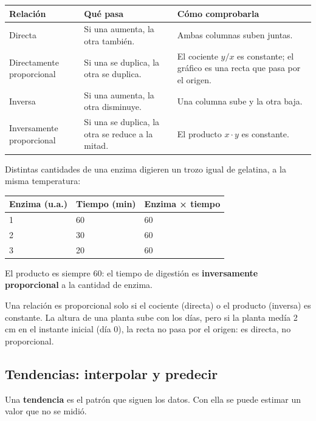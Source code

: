 \begin{center}\small
\begin{tabularx}{\linewidth}{@{}>{\raggedright\arraybackslash\hsize=0.71\hsize}X>{\raggedright\arraybackslash\hsize=1.14\hsize}X>{\raggedright\arraybackslash\hsize=1.14\hsize}X@{}}
\toprule
\textbf{Relación} & \textbf{Qué pasa} & \textbf{Cómo comprobarla} \\
\midrule
Directa & Si una aumenta, la otra también. & Ambas columnas suben juntas. \\
Directamente proporcional & Si una se duplica, la otra se duplica. & El cociente $y/x$ es constante; el gráfico es una recta que pasa por el origen. \\
Inversa & Si una aumenta, la otra disminuye. & Una columna sube y la otra baja. \\
Inversamente proporcional & Si una se duplica, la otra se reduce a la mitad. & El producto $x\cdot y$ es constante. \\
\bottomrule
\end{tabularx}
\end{center}
  
\begin{ejemplo} Distintas cantidades de una enzima digieren un trozo igual de gelatina, a la misma temperatura:
\begin{center}\small
\begin{tabular}{@{}lll@{}}
\toprule
\textbf{Enzima (u.a.)} & \textbf{Tiempo (min)} & \textbf{Enzima × tiempo} \\
\midrule
1 & 60 & 60 \\
2 & 30 & 60 \\
3 & 20 & 60 \\
\bottomrule
\end{tabular}
\end{center}
 El producto es siempre 60: el tiempo de digestión es \textbf{inversamente proporcional} a la cantidad de enzima.\end{ejemplo}
 
\begin{clave}[{Recuerda}] Una relación es proporcional solo si el cociente (directa) o el producto (inversa) es constante. La altura de una planta sube con los días, pero si la planta medía 2 cm en el instante inicial (día 0), la recta no pasa por el origen: es directa, no proporcional.\end{clave}
\subsection{Tendencias: interpolar y predecir}
Una \textbf{tendencia} es el patrón que siguen los datos. Con ella se puede estimar un valor que no se midió.


